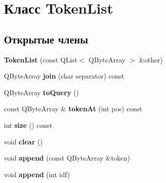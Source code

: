 \hypertarget{class_token_list}{\section{Класс Token\-List}
\label{class_token_list}
}
\subsection*{Открытые члены}
\begin{DoxyCompactItemize}
\item 
\hypertarget{class_token_list_af7f3d65db42ad63fe9cfab9ba3a4ce21}{{\bfseries Token\-List} (const Q\-List$<$ Q\-Byte\-Array $>$ \&other)}\label{class_token_list_af7f3d65db42ad63fe9cfab9ba3a4ce21}

\item 
\hypertarget{class_token_list_aeb9ff397f84e74db8b9a76f27270f185}{Q\-Byte\-Array {\bfseries join} (char separator) const }\label{class_token_list_aeb9ff397f84e74db8b9a76f27270f185}

\item 
\hypertarget{class_token_list_a8f3d16b80db3eb9630149732e569e9da}{Q\-Byte\-Array {\bfseries to\-Query} ()}\label{class_token_list_a8f3d16b80db3eb9630149732e569e9da}

\item 
\hypertarget{class_token_list_a9c83922020569711e8a2e44ce9b8bd01}{const Q\-Byte\-Array \& {\bfseries token\-At} (int pos) const }\label{class_token_list_a9c83922020569711e8a2e44ce9b8bd01}

\item 
\hypertarget{class_token_list_a2718dcbf86a8d72fd5cd135c5b91840a}{int {\bfseries size} () const }\label{class_token_list_a2718dcbf86a8d72fd5cd135c5b91840a}

\item 
\hypertarget{class_token_list_af3bfe705dfaeb0f8649954535f32272e}{void {\bfseries clear} ()}\label{class_token_list_af3bfe705dfaeb0f8649954535f32272e}

\item 
\hypertarget{class_token_list_a8fdaae54a370ee2ff923c00e858f35c2}{void {\bfseries append} (const Q\-Byte\-Array \&token)}\label{class_token_list_a8fdaae54a370ee2ff923c00e858f35c2}

\item 
\hypertarget{class_token_list_a1fef34ae997188f61b4162d8d1eed613}{void {\bfseries append} (int idf)}\label{class_token_list_a1fef34ae997188f61b4162d8d1eed613}


\end{DoxyCompactItemize}

